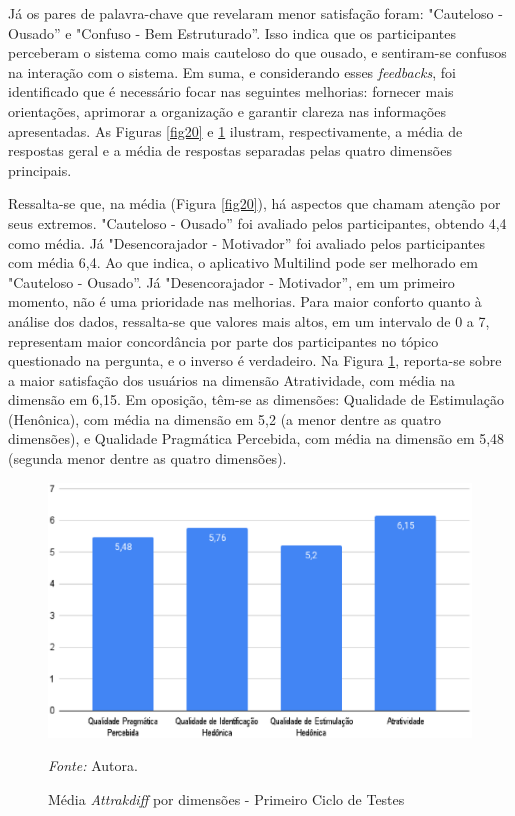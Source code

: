Já os pares de palavra-chave que revelaram menor satisfação foram: "Cauteloso - Ousado'' e "Confuso - Bem Estruturado''. Isso indica que os participantes perceberam o sistema como mais cauteloso do que ousado, e 
sentiram-se confusos na interação com o sistema. Em suma, e considerando esses \textit{feedbacks}, foi identificado que é necessário focar nas seguintes melhorias: fornecer mais orientações, aprimorar a 
organização e garantir clareza nas informações apresentadas. As Figuras \ref{fig20} e \ref{fig21} ilustram, respectivamente, a média de respostas geral e a média de respostas separadas pelas quatro dimensões principais. 

Ressalta-se que, na média (Figura \ref{fig20}), há aspectos que chamam atenção por seus extremos. "Cauteloso - Ousado'' foi avaliado pelos participantes, obtendo 4,4 como média. Já "Desencorajador - Motivador'' foi avaliado pelos 
participantes com média 6,4. Ao que indica, o aplicativo Multilind pode ser melhorado em "Cauteloso - Ousado''. Já "Desencorajador - Motivador'', em um primeiro momento, não é uma prioridade nas melhorias. Para maior conforto 
quanto à análise dos dados, ressalta-se que valores mais altos, em um intervalo de 0 a 7, representam maior concordância por parte dos participantes no tópico questionado na pergunta, e o inverso é verdadeiro. Na Figura \ref{fig21}, 
reporta-se sobre a maior satisfação dos usuários na dimensão Atratividade, com média na dimensão em 6,15. Em oposição, têm-se as dimensões: Qualidade de Estimulação (Henônica), com média na dimensão em 5,2 (a menor dentre 
as quatro dimensões), e Qualidade Pragmática Percebida, com média na dimensão em 5,48 (segunda menor dentre as quatro dimensões).

\begin{figure}[h!]
	\centering
	\caption{Média \textit{Attrakdiff} por dimensões - Primeiro Ciclo de Testes}
	\begin{adjustbox}{center}
		\includegraphics[width=1\textwidth]{figuras/media-separada.eps}
	\end{adjustbox}
	\begin{tablenotes}[flushleft]
		\centering
		\item \textit{Fonte:} Autora.
	\end{tablenotes}
	\label{fig21}
\end{figure}